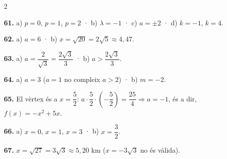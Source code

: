 \documentclass[13pt,a4paper]{extarticle}
\begin{document}
\begin{multicols}{2}
\par\noindent\begin{minipage}{\linewidth}
\textbf{61.} a) $p=0$, $p=1$, $p=2$ · b) $\lambda=-1$ · c) $a=\pm 2$ · d) $k=-1$, $k=4$.\par
\end{minipage}\par\vspace{1.6mm}
\par\noindent\begin{minipage}{\linewidth}
\textbf{62.} a) $a=6$ · b) $x=\sqrt{20}=2\sqrt5\approx 4{,}47$.\par
\end{minipage}\par\vspace{1.6mm}
\par\noindent\begin{minipage}{\linewidth}
\textbf{63.} a) $a=\dfrac{2}{\sqrt3}=\dfrac{2\sqrt3}{3}$ · b) $a>\dfrac{2\sqrt3}{3}$.\par
\end{minipage}\par\vspace{1.6mm}
\par\noindent\begin{minipage}{\linewidth}
\textbf{64.} a) $a=3$ ($a=1$ no compleix $a>2$) · b) $m=-2$.\par
\end{minipage}\par\vspace{1.6mm}
\par\noindent\begin{minipage}{\linewidth}
\textbf{65.} El vèrtex és a $x=\dfrac52$: $a\cdot\dfrac52\cdot\left(-\dfrac52\right)=\dfrac{25}{4}\Rightarrow a=-1$, és a dir, $f(x)=-x^2+5x$.\par
\end{minipage}\par\vspace{1.6mm}
\par\noindent\begin{minipage}{\linewidth}
\textbf{66.} a) $x=0$, $x=1$, $x=3$ · b) $x=\dfrac32$.\par
\end{minipage}\par\vspace{1.6mm}
\par\noindent\begin{minipage}{\linewidth}
\textbf{67.} $x=\sqrt{27}=3\sqrt3\approx 5{,}20$ km ($x=-3\sqrt3$ no és vàlida).\par

\end{minipage}
\end{multicols}
\end{document}
